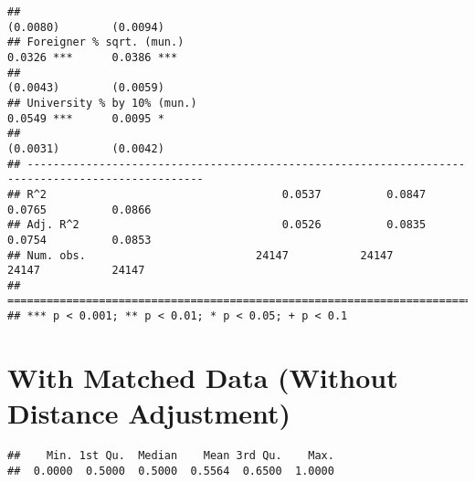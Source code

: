 \documentclass[
]{article}
\newenvironment{Shaded}{\begin{snugshade}}{\end{snugshade}}
\newcommand{\DecValTok}[1]{\textcolor[rgb]{0.00,0.00,0.81}{#1}}
\newcommand{\FloatTok}[1]{\textcolor[rgb]{0.00,0.00,0.81}{#1}}
\newcommand{\KeywordTok}[1]{\textcolor[rgb]{0.13,0.29,0.53}{\textbf{#1}}}
\newcommand{\NormalTok}[1]{#1}
\newcommand{\OperatorTok}[1]{\textcolor[rgb]{0.81,0.36,0.00}{\textbf{#1}}}
\newcommand{\StringTok}[1]{\textcolor[rgb]{0.31,0.60,0.02}{#1}}
\begin{document}
\begin{verbatim}
##                                                                       (0.0080)        (0.0094)   
## Foreigner % sqrt. (mun.)                                               0.0326 ***      0.0386 ***
##                                                                       (0.0043)        (0.0059)   
## University % by 10% (mun.)                                             0.0549 ***      0.0095 *  
##                                                                       (0.0031)        (0.0042)   
## -------------------------------------------------------------------------------------------------
## R^2                                    0.0537          0.0847          0.0765          0.0866    
## Adj. R^2                               0.0526          0.0835          0.0754          0.0853    
## Num. obs.                          24147           24147           24147           24147         
## =================================================================================================
## *** p < 0.001; ** p < 0.01; * p < 0.05; + p < 0.1
\end{verbatim}

\hypertarget{with-matched-data-without-distance-adjustment}{%
\section{With Matched Data (Without Distance
Adjustment)}\label{with-matched-data-without-distance-adjustment}}

\begin{Shaded}
\end{Shaded}

\begin{verbatim}
##    Min. 1st Qu.  Median    Mean 3rd Qu.    Max. 
##  0.0000  0.5000  0.5000  0.5564  0.6500  1.0000
\end{verbatim}
\end{document}
